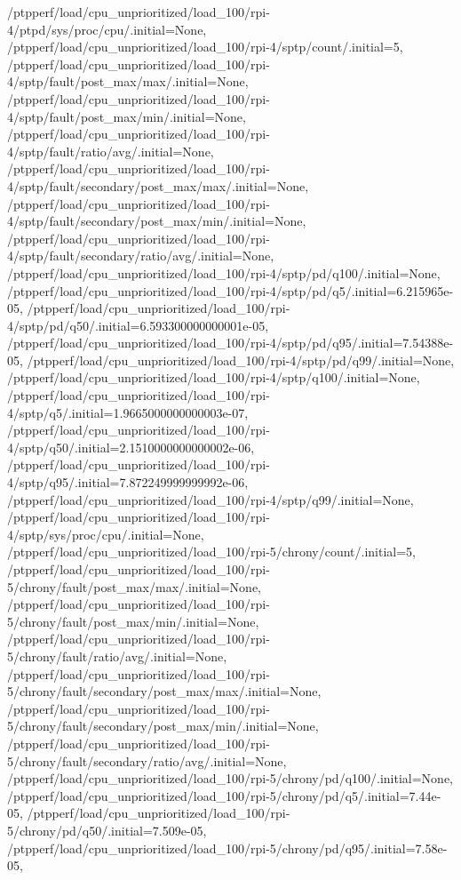 {    /ptpperf/load/cpu_unprioritized/load_100/rpi-4/ptpd/sys/proc/cpu/.initial=None,
    /ptpperf/load/cpu_unprioritized/load_100/rpi-4/sptp/count/.initial=5,
    /ptpperf/load/cpu_unprioritized/load_100/rpi-4/sptp/fault/post_max/max/.initial=None,
    /ptpperf/load/cpu_unprioritized/load_100/rpi-4/sptp/fault/post_max/min/.initial=None,
    /ptpperf/load/cpu_unprioritized/load_100/rpi-4/sptp/fault/ratio/avg/.initial=None,
    /ptpperf/load/cpu_unprioritized/load_100/rpi-4/sptp/fault/secondary/post_max/max/.initial=None,
    /ptpperf/load/cpu_unprioritized/load_100/rpi-4/sptp/fault/secondary/post_max/min/.initial=None,
    /ptpperf/load/cpu_unprioritized/load_100/rpi-4/sptp/fault/secondary/ratio/avg/.initial=None,
    /ptpperf/load/cpu_unprioritized/load_100/rpi-4/sptp/pd/q100/.initial=None,
    /ptpperf/load/cpu_unprioritized/load_100/rpi-4/sptp/pd/q5/.initial=6.215965e-05,
    /ptpperf/load/cpu_unprioritized/load_100/rpi-4/sptp/pd/q50/.initial=6.593300000000001e-05,
    /ptpperf/load/cpu_unprioritized/load_100/rpi-4/sptp/pd/q95/.initial=7.54388e-05,
    /ptpperf/load/cpu_unprioritized/load_100/rpi-4/sptp/pd/q99/.initial=None,
    /ptpperf/load/cpu_unprioritized/load_100/rpi-4/sptp/q100/.initial=None,
    /ptpperf/load/cpu_unprioritized/load_100/rpi-4/sptp/q5/.initial=1.9665000000000003e-07,
    /ptpperf/load/cpu_unprioritized/load_100/rpi-4/sptp/q50/.initial=2.1510000000000002e-06,
    /ptpperf/load/cpu_unprioritized/load_100/rpi-4/sptp/q95/.initial=7.872249999999992e-06,
    /ptpperf/load/cpu_unprioritized/load_100/rpi-4/sptp/q99/.initial=None,
    /ptpperf/load/cpu_unprioritized/load_100/rpi-4/sptp/sys/proc/cpu/.initial=None,
    /ptpperf/load/cpu_unprioritized/load_100/rpi-5/chrony/count/.initial=5,
    /ptpperf/load/cpu_unprioritized/load_100/rpi-5/chrony/fault/post_max/max/.initial=None,
    /ptpperf/load/cpu_unprioritized/load_100/rpi-5/chrony/fault/post_max/min/.initial=None,
    /ptpperf/load/cpu_unprioritized/load_100/rpi-5/chrony/fault/ratio/avg/.initial=None,
    /ptpperf/load/cpu_unprioritized/load_100/rpi-5/chrony/fault/secondary/post_max/max/.initial=None,
    /ptpperf/load/cpu_unprioritized/load_100/rpi-5/chrony/fault/secondary/post_max/min/.initial=None,
    /ptpperf/load/cpu_unprioritized/load_100/rpi-5/chrony/fault/secondary/ratio/avg/.initial=None,
    /ptpperf/load/cpu_unprioritized/load_100/rpi-5/chrony/pd/q100/.initial=None,
    /ptpperf/load/cpu_unprioritized/load_100/rpi-5/chrony/pd/q5/.initial=7.44e-05,
    /ptpperf/load/cpu_unprioritized/load_100/rpi-5/chrony/pd/q50/.initial=7.509e-05,
    /ptpperf/load/cpu_unprioritized/load_100/rpi-5/chrony/pd/q95/.initial=7.58e-05,
}
